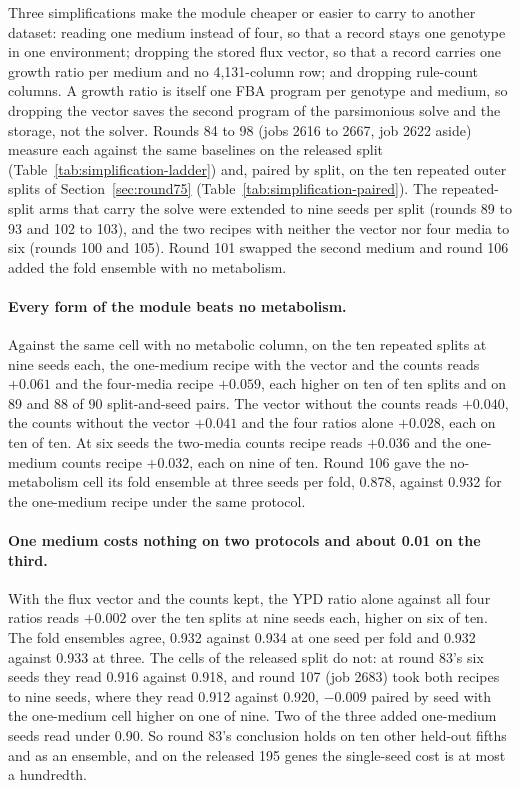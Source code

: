 Three simplifications make the module cheaper or easier to carry to another dataset:
reading one medium instead of four, so that a record stays one genotype in one
environment; dropping the stored flux vector, so that a record carries one growth ratio
per medium and no 4,131-column row; and dropping rule-count columns. A growth ratio is
itself one FBA program per genotype and medium, so dropping the vector saves the second
program of the parsimonious solve and the storage, not the solver. Rounds 84 to 98 (jobs 2616 to 2667, job 2622 aside) measure each against the
same baselines on the released split (Table~\ref{tab:simplification-ladder}) and, paired
by split, on the ten repeated outer splits of Section~\ref{sec:round75}
(Table~\ref{tab:simplification-paired}). The repeated-split arms that carry the solve were
extended to nine seeds per split (rounds 89 to 93 and 102 to 103), and the two recipes
with neither the vector nor four media to six (rounds 100 and 105). Round 101 swapped
the second medium and round 106 added the fold ensemble with no metabolism.

\paragraph{Every form of the module beats no metabolism.} Against the same cell with no
metabolic column, on the ten repeated splits at nine seeds each, the one-medium recipe
with the vector and the counts reads $+0.061$ and the four-media recipe $+0.059$, each
higher on ten of ten splits and on 89 and 88 of 90 split-and-seed pairs. The vector
without the counts reads $+0.040$, the counts without the vector $+0.041$ and the four
ratios alone $+0.028$, each on ten of ten. At six seeds the two-media counts recipe reads
$+0.036$ and the one-medium counts recipe $+0.032$, each on nine of ten. Round 106 gave
the no-metabolism cell its fold ensemble at three seeds per fold, 0.878, against 0.932
for the one-medium recipe under the same protocol.

\paragraph{One medium costs nothing on two protocols and about 0.01 on the third.} With
the flux vector and the counts kept, the YPD ratio alone against all four ratios reads
$+0.002$ over the ten splits at nine seeds each, higher on six of ten. The fold ensembles
agree, 0.932 against 0.934 at one seed per fold and 0.932 against 0.933 at three. The
cells of the released split do not: at round 83's six seeds they read 0.916 against
0.918, and round 107 (job 2683) took both recipes to nine seeds, where they read 0.912
against 0.920, $-0.009$ paired by seed with the one-medium cell higher on one of nine.
Two of the three added one-medium seeds read under 0.90. So round 83's conclusion holds
on ten other held-out fifths and as an ensemble, and on the released 195 genes the
single-seed cost is at most a hundredth.

